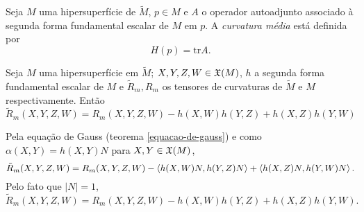 
\begin{definicao}\label{def:curvatura-media}
	Seja $M$ uma hipersuperfície de $\tilde{M}$,
	$p \in M$ e
	$A$ o operador autoadjunto associado à segunda forma fundamental escalar de $M$ em $p$.
	A \emph{curvatura média} está definida por
	\begin{equation*}
	H(p) = \text{tr} A.
	\end{equation*}
\end{definicao}

\begin{corolario}\label{equacao-de-gauss-hipersuperficies}
	Seja $M$ uma hipersuperfície em $\tilde{M}$;
	$X,Y,Z,W \in \mathfrak{X}(M)$,
	$h$ a segunda forma fundamental escalar de $M$ e
	$\tilde{R}_m, R_m$ os tensores de curvaturas de $\tilde{M}$ e $M$ respectivamente.
	Então
	\begin{equation*}
	\tilde{R}_m(X,Y,Z,W) = R_m(X,Y,Z,W) - h(X,W) h(Y,Z) + h(X,Z) h(Y,W)
	\end{equation*}
\end{corolario}

\begin{demonstracao}
	Pela equação de Gauss (teorema \ref{equacao-de-gauss}) e como $\alpha(X,Y)= h(X,Y) N$ para $X,Y \in \mathfrak{X}(M)$,
	\begin{equation*}
	\tilde{R}_m(X,Y,Z,W) = R_m(X,Y,Z,W) - \left\langle h(X,W) N,h(Y,Z) N \right\rangle + \left\langle h(X,Z)N,h(Y,W)N \right\rangle.
	\end{equation*}
	Pelo fato que $|N|=1$,
	\begin{equation*}
	\tilde{R}_m(X,Y,Z,W) = R_m(X,Y,Z,W) - h(X,W) h(Y,Z) + h(X,Z) h(Y,W).
	\end{equation*}
\end{demonstracao}


